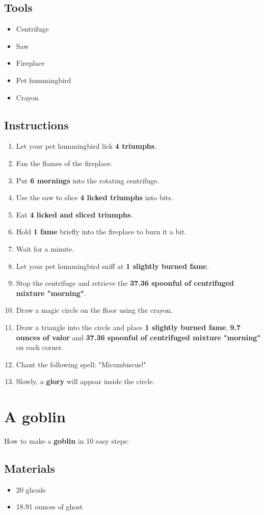 \documentclass{article}
\begin{document}
\subsection{Tools}\begin{itemize}
\item 
Centrifuge
\item 
Saw
\item 
Fireplace
\item 
Pet hummingbird
\item 
Crayon
\end{itemize}
\subsection{Instructions}\begin{enumerate}
\item 
Let your pet hummingbird lick \textbf{4 triumphs}.
\item 
Fan the flames of the fireplace.
\item 
Put \textbf{6 mornings} into the rotating centrifuge.
\item 
Use the saw to slice \textbf{4 licked triumphs} into bits.
\item 
Eat \textbf{4 licked and sliced triumphs}.
\item 
Hold \textbf{1 fame} briefly into the fireplace to burn it a bit.
\item 
Wait for a minute.
\item 
Let your pet hummingbird sniff at \textbf{1 slightly burned fame}.
\item 
Stop the centrifuge and retrieve the \textbf{37.36 spoonful of centrifuged mixture "morning"}.
\item 
Draw a magic circle on the floor using the crayon.
\item 
Draw a triangle into the circle and place \textbf{1 slightly burned fame}, \textbf{9.7 ounces of valor} and \textbf{37.36 spoonful of centrifuged mixture "morning"} on each corner.
\item 
Chant the following spell: "Micumbiscus!"
\item 
Slowly, a \textbf{glory} will appear inside the circle.
\end{enumerate}
\newpage
\section{A goblin}How to make a \textbf{goblin} in 10 easy steps:

\subsection{Materials}\begin{itemize}
\item 
20 ghouls
\item 
18.91 ounces of ghost
\end{itemize}
\end{document}
